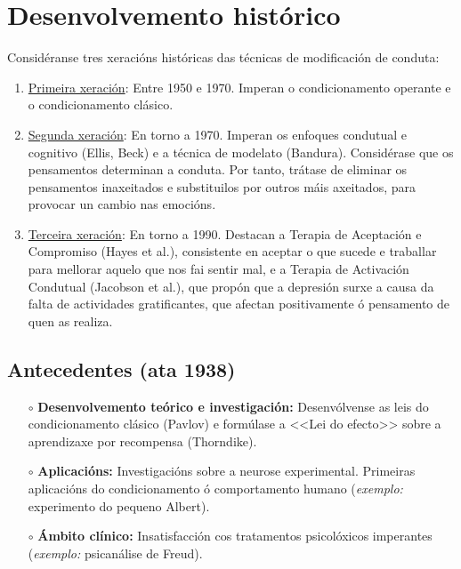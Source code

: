 \documentclass[a4paper,11pt]{article}
\begin{document}
\section{Desenvolvemento histórico}
Considéranse tres xeracións históricas das técnicas de modificación de conduta:
\begin{enumerate}
	\item \underline{Primeira xeración}: Entre 1950 e 1970. Imperan o condicionamento operante e o 
	condicionamento clásico.
	\item \underline{Segunda xeración}: En torno a 1970. Imperan os enfoques condutual e cognitivo 
	(Ellis, Beck) e a técnica de modelato (Bandura). Considérase que os pensamentos determinan a 
	conduta. Por tanto, trátase de eliminar os pensamentos inaxeitados e substituilos por outros máis 
	axeitados, para provocar un cambio nas emocións. 
	\item \underline{Terceira xeración}: En torno a 1990. Destacan a Terapia de Aceptación e 
	Compromiso (Hayes et al.), consistente en aceptar o que sucede e traballar para mellorar aquelo 
	que nos fai sentir mal, e a Terapia de Activación Condutual (Jacobson et al.), que propón que a 
	depresión surxe a causa da falta de actividades gratificantes, que afectan positivamente ó 
	pensamento de quen as realiza. 
\end{enumerate}

\subsection{Antecedentes (ata 1938)}
\begin{itemize}
	\item[$\circ$] \textbf{Desenvolvemento teórico e investigación:} Desenvólvense as leis do 
	condicionamento clásico (Pavlov) e formúlase a <<Lei do efecto>> sobre a aprendizaxe por 
	recompensa (Thorndike).
	\item[$\circ$] \textbf{Aplicacións:} Investigacións sobre a neurose experimental. Primeiras 
	aplicacións do condicionamento ó comportamento humano (\textit{exemplo:} experimento do pequeno 
	Albert). 
	\item[$\circ$] \textbf{Ámbito clínico:} Insatisfacción cos tratamentos psicolóxicos imperantes 
	(\textit{exemplo:} psicanálise de Freud). 
\end{itemize}
\end{document}
